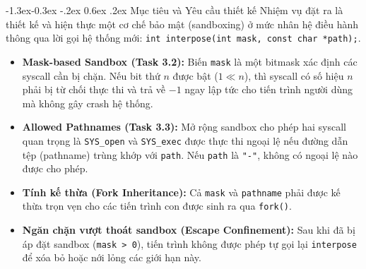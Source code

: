 \documentclass[11pt,a4paper]{article}
\makeatletter
\renewcommand\subsection{\@startsection{subsection}{2}{\z@}%
                                     {-1.3ex\@plus -0.3ex \@minus -.2ex}%
                                     {0.6ex \@plus .2ex}%
                                     {\normalfont\normalsize\bfseries}}
\makeatother
\begin{document}
\subsection{Mục tiêu và Yêu cầu thiết kế}
Nhiệm vụ đặt ra là thiết kế và hiện thực một cơ chế bảo mật (sandboxing) ở mức nhân hệ điều hành thông qua lời gọi hệ thống mới: \texttt{int interpose(int mask, const char *path);}.
\begin{itemize}
    \item \textbf{Mask-based Sandbox (Task 3.2):} Biến \texttt{mask} là một bitmask xác định các syscall cần bị chặn. Nếu bit thứ $n$ được bật ($1 \ll n$), thì syscall có số hiệu $n$ phải bị từ chối thực thi và trả về $-1$ ngay lập tức cho tiến trình người dùng mà không gây crash hệ thống.
    \item \textbf{Allowed Pathnames (Task 3.3):} Mở rộng sandbox cho phép hai syscall quan trọng là \texttt{SYS\_open} và \texttt{SYS\_exec} được thực thi ngoại lệ nếu đường dẫn tệp (pathname) trùng khớp với \texttt{path}. Nếu \texttt{path} là \texttt{"-"}, không có ngoại lệ nào được cho phép.
    \item \textbf{Tính kế thừa (Fork Inheritance):} Cả \texttt{mask} và \texttt{pathname} phải được kế thừa trọn vẹn cho các tiến trình con được sinh ra qua \texttt{fork()}.
    \item \textbf{Ngăn chặn vượt thoát sandbox (Escape Confinement):} Sau khi đã bị áp đặt sandbox (\texttt{mask > 0}), tiến trình không được phép tự gọi lại \texttt{interpose} để xóa bỏ hoặc nới lỏng các giới hạn này.
\end{itemize}
\end{document}
